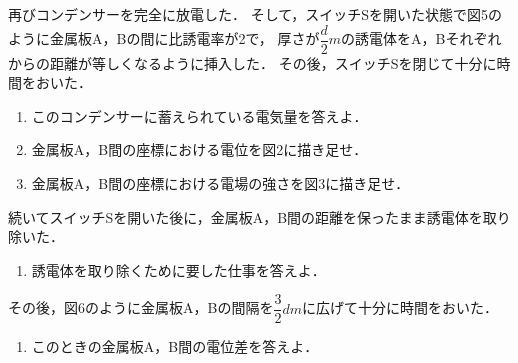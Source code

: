 再びコンデンサーを完全に放電した．
そして，スイッチSを開いた状態で図5のように金属板A，Bの間に比誘電率が2で，
厚さが$\dfrac{d}{2}\unit{m}$の誘電体をA，Bそれぞれからの距離が等しくなるように挿入した．
その後，スイッチSを閉じて十分に時間をおいた．

\begin{enumerate}[（1）]
  \setlength{\leftskip}{-1.5zw}
  \setlength{\itemindent}{1zw}\setlength{\labelsep}{0.5zw}
  \setlength{\labelwidth}{1zw}\setlength{\leftmargin}{1zw}
  \setlength{\itemsep}{0.5\baselineskip}
  \addtocounter{enumi}{6}
  \item このコンデンサーに蓄えられている電気量を答えよ．
  \item 金属板A，B間の座標\x における電位を図2に描き足せ．
  \item 金属板A，B間の座標\x における電場の強さを図3に描き足せ．
\end{enumerate}

続いてスイッチSを開いた後に，金属板A，B間の距離を保ったまま誘電体を取り除いた．
\begin{enumerate}[（1）]
  \setlength{\leftskip}{-1.5zw}
  \setlength{\itemindent}{1zw}\setlength{\labelsep}{0.5zw}
  \setlength{\labelwidth}{1zw}\setlength{\leftmargin}{1zw}
  \setlength{\itemsep}{0.5\baselineskip}
  \addtocounter{enumi}{9}
  \item 誘電体を取り除くために要した仕事を答えよ．
\end{enumerate}

その後，図6のように金属板A，Bの間隔を$\dfrac{3}{2}d\unit{m}$に広げて十分に時間をおいた．
\begin{enumerate}[（1）]
  \setlength{\leftskip}{-1.5zw}
  \setlength{\itemindent}{1zw}\setlength{\labelsep}{0.5zw}
  \setlength{\labelwidth}{1zw}\setlength{\leftmargin}{1zw}
  \setlength{\itemsep}{0.5\baselineskip}
  \addtocounter{enumi}{10}
  \item このときの金属板A，B間の電位差を答えよ．
\end{enumerate}

